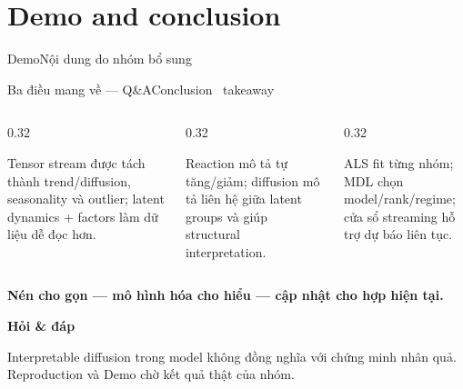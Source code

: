 \section{Demo and conclusion}

\begin{frame}{Demo}{Nội dung do nhóm bổ sung}
\end{frame}

\begin{frame}[shrink=27]{Ba điều mang về --- Q\&A}{Conclusion \textperiodcentered\ takeaway}
\begin{columns}[T,onlytextwidth]
\begin{column}{0.32\textwidth}
\begin{intuition}
  Tensor stream được tách thành trend/diffusion, seasonality và outlier; latent dynamics + factors làm dữ liệu dễ đọc hơn.
\end{intuition}
\end{column}
\begin{column}{0.32\textwidth}
\begin{mathcard}
  Reaction mô tả tự tăng/giảm; diffusion mô tả liên hệ giữa latent groups và giúp structural interpretation.
\end{mathcard}
\end{column}
\begin{column}{0.32\textwidth}
\begin{takeaway}
  ALS fit từng nhóm; MDL chọn model/rank/regime; cửa sổ streaming hỗ trợ dự báo liên tục.
\end{takeaway}
\end{column}
\end{columns}
\vspace{7mm}
\centering
{\LARGE\bfseries\color{DTNavy}Nén cho gọn --- mô hình hóa cho hiểu --- cập nhật cho hợp hiện tại.}
\vspace{5mm}

{\Large\color{DTGold}\textbf{Hỏi \& đáp}}
\vspace{3mm}
\begin{caution}
  Interpretable diffusion trong model không đồng nghĩa với chứng minh nhân quả. Reproduction và Demo chờ kết quả thật của nhóm.
\end{caution}
\vspace{2mm}
\end{frame}
